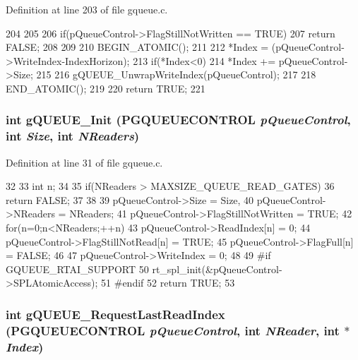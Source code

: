 Definition at line 203 of file gqueue.c.


\begin{DoxyCode}
204 {
205 
206     if(pQueueControl->FlagStillNotWritten == TRUE){
207         return FALSE;
208     }
209 
210 BEGIN_ATOMIC();
211     
212         *Index = (pQueueControl->WriteIndex-IndexHorizon);
213         if(*Index<0){
214                 *Index += pQueueControl->Size;
215         }
216         gQUEUE_UnwrapWriteIndex(pQueueControl);
217 
218 END_ATOMIC();
219 
220     return TRUE;
221 }                      
\end{DoxyCode}
\subsubsection[{gQUEUE\_\-Init}]{\setlength{\rightskip}{0pt plus 5cm}int gQUEUE\_\-Init ({\bf PGQUEUECONTROL} {\em pQueueControl}, \/  int {\em Size}, \/  int {\em NReaders})}\label{gqueue_8h_a6edb74779d40a7a4328e32012fad8c0c}


Definition at line 31 of file gqueue.c.


\begin{DoxyCode}
32 {
33         int n;
34 
35         if(NReaders > MAXSIZE_QUEUE_READ_GATES){
36                 return FALSE;
37         }
38 
39         pQueueControl->Size = Size,
40         pQueueControl->NReaders = NReaders;
41         pQueueControl->FlagStillNotWritten = TRUE;
42         for(n=0;n<NReaders;++n){
43                 pQueueControl->ReadIndex[n] = 0;
44                 pQueueControl->FlagStillNotRead[n] = TRUE;
45                 pQueueControl->FlagFull[n] = FALSE;
46         }
47         pQueueControl->WriteIndex = 0;
48 
49 #if GQUEUE_RTAI_SUPPORT
50         rt_spl_init(&pQueueControl->SPLAtomicAccess);
51 #endif
52     return TRUE;
53 }                      
\end{DoxyCode}
\subsubsection[{gQUEUE\_\-RequestLastReadIndex}]{\setlength{\rightskip}{0pt plus 5cm}int gQUEUE\_\-RequestLastReadIndex ({\bf PGQUEUECONTROL} {\em pQueueControl}, \/  int {\em NReader}, \/  int $\ast$ {\em Index})}\label{gqueue_8h_a61763c54eaa8dd611c81c75745e9b3b2}


